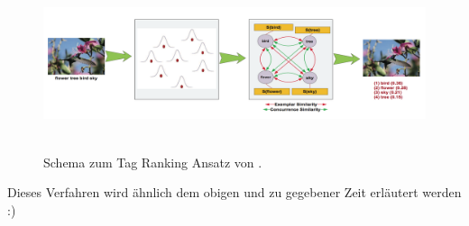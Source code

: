 \begin{figure}[htbp]
  \centering
    \includegraphics[height=2in]{images/tag_ranking_verfahren.png}
  \caption{Schema zum Tag Ranking Ansatz von \cite{ranking}.}
  \label{fig:images_tag_ranking_verfahren}
\end{figure}


Dieses Verfahren wird ähnlich dem obigen und zu gegebener Zeit erläutert werden :)

